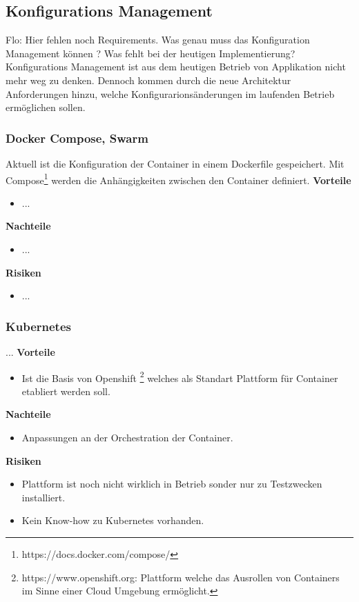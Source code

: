 \subsection{Konfigurations Management}

Flo: Hier fehlen noch Requirements. Was genau muss das Konfiguration Management können ? Was fehlt bei der heutigen Implementierung?
Konfigurations Management ist aus dem heutigen Betrieb von Applikation nicht mehr weg zu denken. Dennoch kommen durch die neue Architektur Anforderungen hinzu, welche Konfigurarionsänderungen im laufenden Betrieb ermöglichen sollen.

\subsubsection{Docker Compose, Swarm}

Aktuell ist die Konfiguration der Container in einem Dockerfile gespeichert. Mit Compose\footnote{https://docs.docker.com/compose/} werden die Anhängigkeiten zwischen den Container definiert.\newline
\newline
\textbf{Vorteile}
\begin{itemize}
	\item ...
\end{itemize}
\textbf{Nachteile}
\begin{itemize}
	\item ...
\end{itemize}
\textbf{Risiken}
\begin{itemize}
	\item ...
\end{itemize}

\subsubsection{Kubernetes}
...\newline
\newline
\textbf{Vorteile}
\begin{itemize}
	\item Ist die Basis von Openshift \footnote{https://www.openshift.org: Plattform welche das Ausrollen von Containers im Sinne einer Cloud Umgebung ermöglicht.} welches als Standart Plattform für Container etabliert werden soll.
\end{itemize}
\textbf{Nachteile}
\begin{itemize}
	\item Anpassungen an der Orchestration der Container.
\end{itemize}
\textbf{Risiken}
\begin{itemize}
	\item Plattform ist noch nicht wirklich in Betrieb sonder nur zu Testzwecken installiert.
	\item Kein Know-how zu Kubernetes vorhanden.
\end{itemize}
